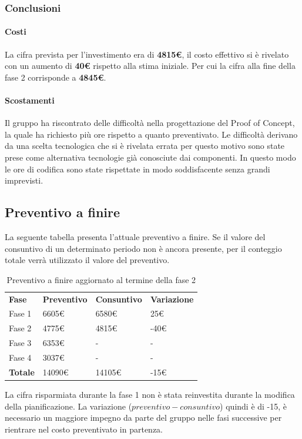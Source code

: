 	\subsubsection{Conclusioni}
		\paragraph{Costi\\}
La cifra prevista per l'investimento era di \textbf{4815€}, il costo effettivo si è rivelato con un aumento di \textbf{40€} rispetto alla stima iniziale. Per cui la cifra alla fine della fase 2 corrisponde a \textbf{4845€}.
 		
		\paragraph{Scostamenti\\}
Il gruppo ha riscontrato delle difficoltà nella progettazione del Proof of Concept, la quale ha richiesto più ore rispetto a quanto preventivato. Le difficoltà derivano da una scelta tecnologica che si è rivelata errata per questo motivo sono state prese come alternativa tecnologie già conosciute dai componenti. In questo modo le ore di codifica sono state rispettate in modo soddisfacente senza grandi imprevisti.

	\newpage
	\subsection{Preventivo a finire}
La seguente tabella presenta l'attuale preventivo a finire. Se il valore del consuntivo di un determinato periodo non è ancora presente, per il conteggio totale verrà utilizzato il valore del preventivo.

\begin{table}[H]
			\centering
		\begin{tabular}{| l | l | l | l |}
			\rowcolor{LightBlue}
			\textbf{\color{white}Fase}
			& \textbf{\color{white}Preventivo}
			& \textbf{\color{white}Consuntivo}
			& \textbf{\color{white}Variazione}
			\\
			
			Fase 1 				& 6605€ 	& 6580€ & 25€\\
			Fase 2 			& 4775€ 	& 4815€ & -40€\\
			Fase 3 		& 6353€ 	& - & -\\
			Fase 4			& 3037€ 	& - & -\\
			\textbf{Totale} & 14090€ & 14105€ & -15€\\ \hline
		\end{tabular}
		\caption{Preventivo a finire aggiornato al termine della fase 2}	
\end{table}
La cifra risparmiata durante la fase 1 non è stata reinvestita durante la modifica della pianificazione. La variazione ($preventivo - consuntivo$) quindi è di -15, è necessario un maggiore impegno da parte del gruppo nelle fasi successive per rientrare nel costo preventivato in partenza. 

\newpage